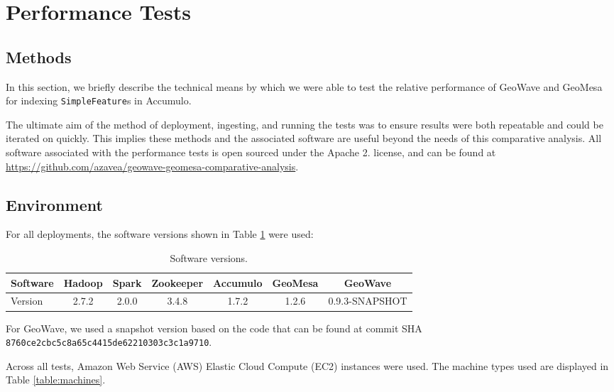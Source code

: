 \section{Performance Tests}
\label{sec:performance}


\subsection{Methods}
\label{sec:performance:methods}

In this section, we briefly describe the technical means by which we were able to test the relative performance of GeoWave and GeoMesa for indexing \texttt{SimpleFeature}s in Accumulo.

The ultimate aim of the method of deployment, ingesting, and running the tests was to ensure results were both repeatable and could be iterated on quickly.
This implies these methods and the associated software are useful beyond the needs of this comparative analysis.
All software associated with the performance tests is open sourced under the Apache 2.
license, and can be found at \url{https://github.com/azavea/geowave-geomesa-comparative-analysis}.


\subsection{Environment}
\label{sec:performance:environment}

For all deployments, the software versions shown in Table \ref{table:software} were used:

\begin{table}[h!tb]
  \centering
  \begin{tabular}{ | l || c | c | c | c | c | c | }
    \hline
    Software & Hadoop & Spark & Zookeeper & Accumulo & GeoMesa & GeoWave \\ \hline
    Version  & 2.7.2  & 2.0.0 & 3.4.8 & 1.7.2 & 1.2.6 & 0.9.3-SNAPSHOT \\
    \hline
  \end{tabular}
  \caption{Software versions.}
  \label{table:software}
\end{table}

For GeoWave, we used a snapshot version based on the code that can be found at commit SHA \texttt{8760ce2cbc5c8a65c4415de62210303c3c1a9710}.

Across all tests, Amazon Web Service (AWS) Elastic Cloud Compute (EC2) instances were used.
The machine types used are displayed in Table \ref{table:machines}.

